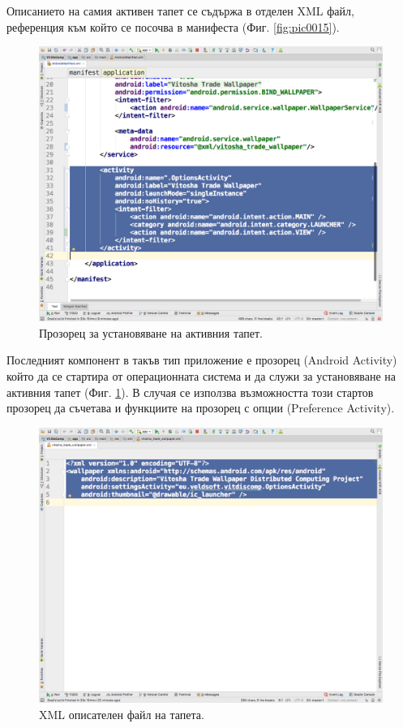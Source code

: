 \documentclass[book,14pt,oneside,openany]{memoir}
\begin{document}
Описанието на самия активен тапет се съдържа в отделен XML файл, референция към който се посочва в манифеста (Фиг. \ref{fig:pic0015}).

\begin{figure}[h]
  \centering
  \includegraphics[height=0.45\pdfpageheight]{./images/pic0016.png}
  \caption{Прозорец за установяване на активния тапет.}
\label{fig:pic0016}
\end{figure}
\FloatBarrier

Последният компонент в такъв тип приложение е прозорец (Android Activity) който да се стартира от операционната система и да служи за установяване на активния тапет (Фиг. \ref{fig:pic0016}). В случая се използва възможността този стартов прозорец да съчетава и функциите на прозорец с опции (Preference Activity).

\begin{figure}[h]
  \centering
  \includegraphics[height=0.45\pdfpageheight]{./images/pic0017.png}
  \caption{XML описателен файл на тапета.}
\label{fig:pic0017}
\end{figure}
\FloatBarrier
\end{document}
